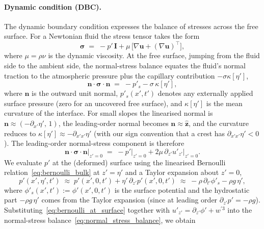 \documentclass{article}
\newcommand{\uu}{\mathbf{u}}
\begin{document}
\paragraph{Dynamic condition (DBC).}
The dynamic boundary condition expresses the balance of stresses across the free surface.
For a Newtonian fluid the stress tensor takes the form
\begin{equation}
    \bm{\sigma} \;=\; -p'\,\bm{I} + \mu\,\big[\nabla\uu + (\nabla\uu)^{\top}\big], \label{eq:stress_tensor}
\end{equation}
where $\mu = \rho\nu$ is the dynamic viscosity.
At the free surface, jumping from the fluid side to the ambient side, the normal-stress balance equates the fluid's normal traction to the atmospheric pressure plus the capillary contribution $-\sigma\kappa[\eta']$,
\begin{equation}
    \bm{n} \cdot \bm{\sigma} \cdot \bm{n} \;=\; -p'_s - \sigma\,\kappa[\eta'], \label{eq:normal_stress_balance}
\end{equation}
where $\bm{n}$ is the outward unit normal, $p'_s(x', t')$ denotes any externally applied surface pressure (zero for an uncovered free surface), and $\kappa[\eta']$ is the mean curvature of the interface.
For small slopes the linearised normal is $\bm{n} \approx (-\partial_{x'}\eta',\, 1)$, the leading-order normal becomes $\bm{n} \approx \hat{\bm{z}}$, and the curvature reduces to $\kappa[\eta'] \approx -\partial_{x'x'}\eta'$ (with our sign convention that a crest has $\partial_{x'x'}\eta' < 0$).
The leading-order normal-stress component is therefore
\begin{equation}
    \bm{n}\cdot\bm{\sigma}\cdot\bm{n}\big|_{z' = 0} \;=\; -p'\big|_{z' = 0} + 2\mu\,\partial_{z'}u'_{z'}\big|_{z' = 0}. \label{eq:normal_stress_linearised}
\end{equation}
We evaluate $p'$ at the (deformed) surface using the linearised Bernoulli relation~\eqref{eq:bernoulli_bulk} at $z' = \eta'$ and a Taylor expansion about $z' = 0$,
\begin{equation}
    p'(x', \eta', t') \;\approx\; p'(x', 0, t') + \eta'\,\partial_{z'}p'(x', 0, t') \;\approx\; -\rho\,\partial_{t'}\phi'_s - \rho g\,\eta', \label{eq:bernoulli_at_surface}
\end{equation}
where $\phi'_s(x', t') := \phi'(x', 0, t')$ is the surface potential and the hydrostatic part $-\rho g\,\eta'$ comes from the Taylor expansion (since at leading order $\partial_{z'}p' = -\rho g$).
Substituting~\eqref{eq:bernoulli_at_surface} together with $u'_{z'} = \partial_{z'}\phi' + w^{\prime 3}$ into the normal-stress balance~\eqref{eq:normal_stress_balance}, we obtain
\end{document}
